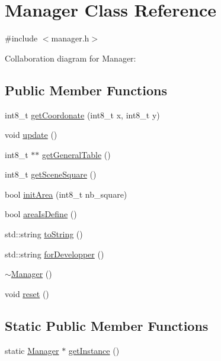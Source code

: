 \hypertarget{class_manager}{\section{Manager Class Reference}
\label{class_manager}
}


{\ttfamily \#include $<$manager.\-h$>$}



Collaboration diagram for Manager\-:
\subsection*{Public Member Functions}
\begin{DoxyCompactItemize}
\item 
int8\-\_\-t \hyperlink{class_manager_ad8d432cd5aa2863d355d2e39d1936861}{get\-Coordonate} (int8\-\_\-t x, int8\-\_\-t y)
\item 
void \hyperlink{class_manager_af43da42550bd9746c5ea61a6aeee80de}{update} ()
\item 
int8\-\_\-t $\ast$$\ast$ \hyperlink{class_manager_a963d327a438d93b100ff68b475d2cf83}{get\-General\-Table} ()
\item 
int8\-\_\-t \hyperlink{class_manager_a60f89ec1bf61d37a74b4cd67a57d5702}{get\-Scene\-Square} ()
\item 
bool \hyperlink{class_manager_aaabcb64f4b95fcd10a778c3c033439fb}{init\-Area} (int8\-\_\-t nb\-\_\-square)
\item 
bool \hyperlink{class_manager_a5040d372e0142f22892fdce49ca96e03}{area\-Is\-Define} ()
\item 
std\-::string \hyperlink{class_manager_abfd21eccf46a73165312fb71293affc3}{to\-String} ()
\item 
std\-::string \hyperlink{class_manager_a21b3e54cbe4b045b9ac40ee53e403897}{for\-Developper} ()
\item 
\hyperlink{class_manager_a322cad25d7007438b3a043ad02253d29}{$\sim$\-Manager} ()
\item 
void \hyperlink{class_manager_a8cb433965677ad622ee43d59e24262e7}{reset} ()
\end{DoxyCompactItemize}
\subsection*{Static Public Member Functions}
\begin{DoxyCompactItemize}
\item 
static \hyperlink{class_manager}{Manager} $\ast$ \hyperlink{class_manager_a5d783bd86e9be93235898a46de80847f}{get\-Instance} ()
\end{DoxyCompactItemize}
